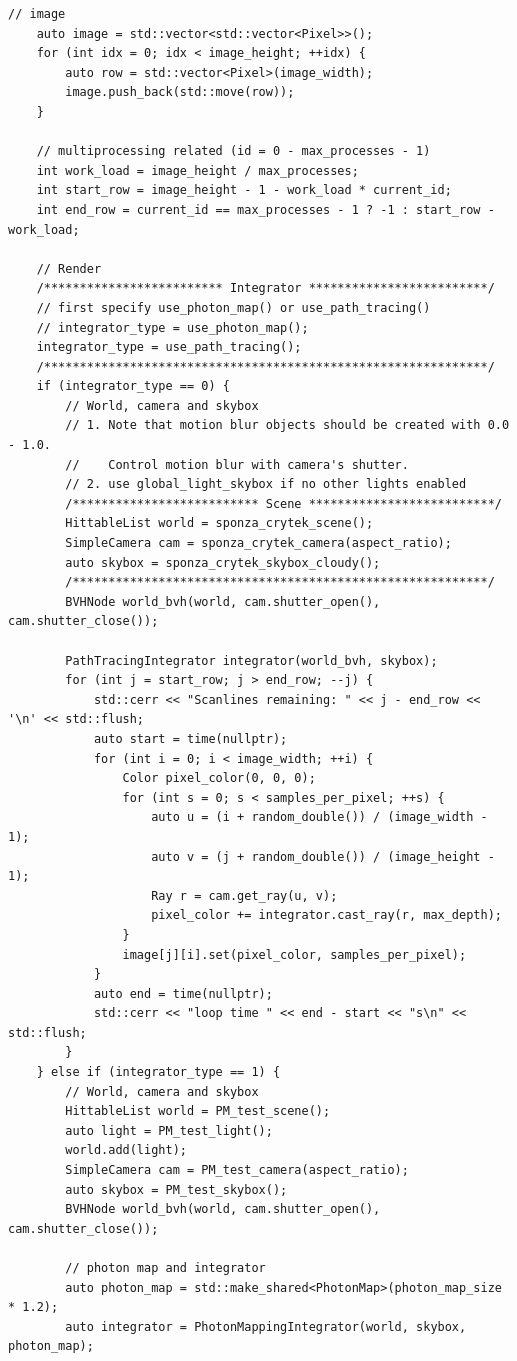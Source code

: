 \documentclass[utf8]{article}
\begin{document}
\begin{lstlisting}[style=CStyle]
	// image
	auto image = std::vector<std::vector<Pixel>>();
	for (int idx = 0; idx < image_height; ++idx) {
		auto row = std::vector<Pixel>(image_width);
		image.push_back(std::move(row));
	}
	
	// multiprocessing related (id = 0 - max_processes - 1)
	int work_load = image_height / max_processes;
	int start_row = image_height - 1 - work_load * current_id;
	int end_row = current_id == max_processes - 1 ? -1 : start_row - work_load;
	
	// Render
	/************************* Integrator *************************/
	// first specify use_photon_map() or use_path_tracing()
	// integrator_type = use_photon_map();
	integrator_type = use_path_tracing();
	/**************************************************************/
	if (integrator_type == 0) {
		// World, camera and skybox
		// 1. Note that motion blur objects should be created with 0.0 - 1.0.
		//    Control motion blur with camera's shutter.
		// 2. use global_light_skybox if no other lights enabled
		/************************** Scene **************************/
		HittableList world = sponza_crytek_scene();
		SimpleCamera cam = sponza_crytek_camera(aspect_ratio);
		auto skybox = sponza_crytek_skybox_cloudy();
		/**********************************************************/
		BVHNode world_bvh(world, cam.shutter_open(), cam.shutter_close());
		
		PathTracingIntegrator integrator(world_bvh, skybox);
		for (int j = start_row; j > end_row; --j) {
			std::cerr << "Scanlines remaining: " << j - end_row << '\n' << std::flush;
			auto start = time(nullptr);
			for (int i = 0; i < image_width; ++i) {
				Color pixel_color(0, 0, 0);
				for (int s = 0; s < samples_per_pixel; ++s) {
					auto u = (i + random_double()) / (image_width - 1);
					auto v = (j + random_double()) / (image_height - 1);
					Ray r = cam.get_ray(u, v);
					pixel_color += integrator.cast_ray(r, max_depth);
				}
				image[j][i].set(pixel_color, samples_per_pixel);
			}
			auto end = time(nullptr);
			std::cerr << "loop time " << end - start << "s\n" << std::flush;
		}
	} else if (integrator_type == 1) {
		// World, camera and skybox
		HittableList world = PM_test_scene();
		auto light = PM_test_light();
		world.add(light);
		SimpleCamera cam = PM_test_camera(aspect_ratio);
		auto skybox = PM_test_skybox();
		BVHNode world_bvh(world, cam.shutter_open(), cam.shutter_close());
		
		// photon map and integrator
		auto photon_map = std::make_shared<PhotonMap>(photon_map_size * 1.2);
		auto integrator = PhotonMappingIntegrator(world, skybox, photon_map);
		

\end{lstlisting}
\end{document}
